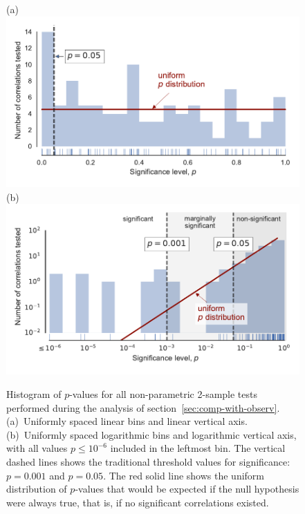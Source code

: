 \begin{figure}
  (a)\\
  \includegraphics[width=\linewidth]{figs/p-value-histogram-new-linear}\\
  (b)\\
  \includegraphics[width=\linewidth]{figs/p-value-histogram-new}
  \caption{Histogram of \(p\)-values for all non-parametric 2-sample
    tests performed during the analysis of
    section~\ref{sec:comp-with-observ}. (a)~Uniformly spaced linear
    bins and linear vertical axis. (b)~Uniformly spaced logarithmic
    bins and logarithmic vertical axis, with all values
    \(p \le 10^{-6}\) included in the leftmost bin.  The vertical dashed
    lines shows the traditional threshold values for significance:
    \(p = 0.001\) and \(p = 0.05\). The red solid line shows the
    uniform distribution of \(p\)-values that would be expected if the
    null hypothesis were always true, that is, if no significant
    correlations existed.}
  \label{fig:histo-p-values}
\end{figure}



